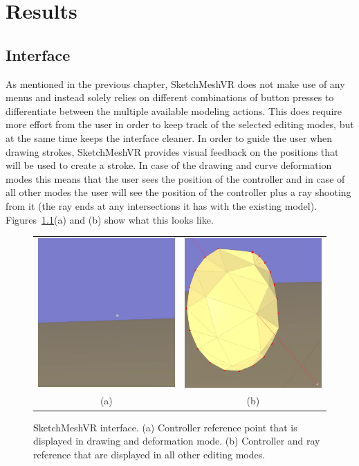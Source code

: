 \chapter{Results}
\label{chap:results}

\section{Interface}
As mentioned in the previous chapter, SketchMeshVR does not make use of any menus and instead solely relies on different combinations of button presses to differentiate between the multiple available modeling actions. This does require more effort from the user in order to keep track of the selected editing modes, but at the same time keeps the interface cleaner. In order to guide the user when drawing strokes, SketchMeshVR provides visual feedback on the positions that will be used to create a stroke. In case of the drawing and curve deformation modes this means that the user sees the position of the controller and in case of all other modes the user will see the position of the controller plus a ray shooting from it (the ray ends at any intersections it has with the existing model). Figures~\ref{fig:interface}(a) and (b) show what this looks like.

\begin{figure}[!h]
    \centering
    \setlength{\tabcolsep}{0.0130\linewidth}
    \begin{tabular}{@{}cc@{}}
    \includegraphics[width=0.3\linewidth]{figures/interface_point}&
  	\includegraphics[width=0.3\linewidth]{figures/interface_ray}\\
    (a)&(b)\\
    \end{tabular}
    \caption[SketchMeshVR interface]{SketchMeshVR interface.
    	  \textup{(a)} Controller reference point that is displayed in drawing and deformation mode.
			  \textup{(b)} Controller and ray reference that are displayed in all other editing modes. 
      \label{fig:interface}}
\end{figure}
 
